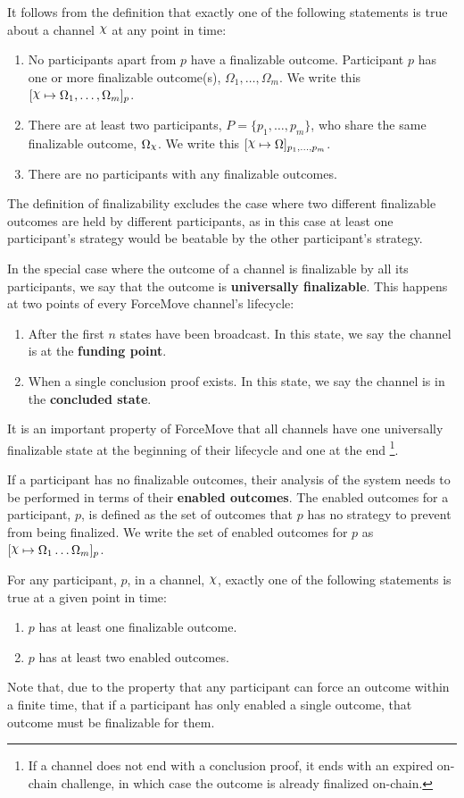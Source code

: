 \documentclass{article}
\begin{document}
It follows from the definition that exactly one of the following statements is true about
a channel $\rchi$ at any point in time:
\begin{enumerate}
  \item No participants apart from $p$ have a finalizable outcome.
        Participant $p$ has one or more finalizable outcome(s), $\Omega_1, \dots, \Omega_m$.
        We write this $\finalizable{\rchi}{\Omega_1, \dots, \Omega_m}{p}$.
  \item There are at least two participants, $P = \{p_1, \dots, p_m \}$, who share the same
        finalizable outcome, $\Omega_\rchi$. We write this $\finalizable{\rchi}{\Omega}{p_1, \dots, p_m}$.
  \item There are no participants with any finalizable outcomes.
\end{enumerate}
The definition of finalizability excludes the case where two different finalizable outcomes are held
by different participants, as in this case at least one participant's strategy would be beatable
by the other participant's strategy.

In the special case where the outcome of a channel is finalizable by all its participants, we say that the outcome is \textbf{universally finalizable}.
This happens at two points of every ForceMove channel's lifecycle:
\begin{enumerate}
  \item After the first $n$ states have been broadcast. In this state, we say the channel is at the \textbf{funding point}.
  \item When a single conclusion proof exists. In this state, we say the channel is in the \textbf{concluded state}.
\end{enumerate}
It is an important property of ForceMove that all channels have one universally finalizable
state at the beginning of their lifecycle and one at the end
\footnote{If a channel does not end with a conclusion proof, it ends with an expired on-chain challenge,
in which case the outcome is already finalized on-chain.}.

If a participant has no finalizable outcomes, their analysis of the system needs to be performed
in terms of their \textbf{enabled outcomes}.
The enabled outcomes for a participant, $p$, is defined as the set of outcomes that $p$ has
no strategy to prevent from being finalized.
We write the set of enabled outcomes for $p$ as $\finalizable{\rchi}{\Omega_1 \dots \Omega_m}{p}$.

For any participant, $p$, in a channel, $\rchi$, exactly one of the following statements is
true at a given point in time:
\begin{enumerate}
  \item $p$ has at least one finalizable outcome.
  \item $p$ has at least two enabled outcomes.
\end{enumerate}
Note that, due to the property that any participant can force an outcome within a finite time,
that if a participant has only enabled a single outcome, that outcome must be finalizable for them.
\end{document}
